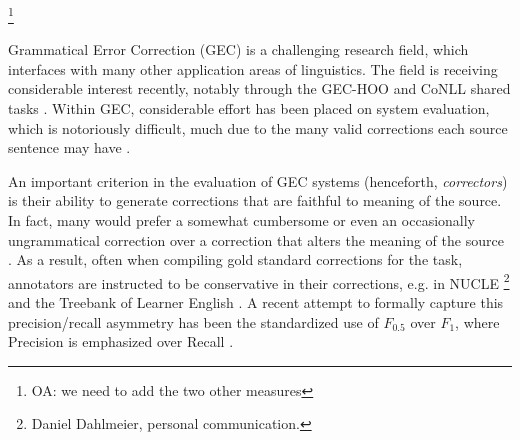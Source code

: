\documentclass[letter,11pt]{article}
\newcommand{\oa}[1]{\footnote{\color{red}OA: #1}}
\begin{document}



\oa{we need to add the two other measures}

Grammatical Error Correction (GEC) is a challenging research field, which interfaces with many
other application areas of linguistics. The field is receiving considerable
interest recently, notably through the GEC-HOO \cite{dale2011helping,dale2012hoo} and
CoNLL shared tasks \cite{kao2013conll,ng2014conll}.
Within GEC, considerable effort has been placed on system evaluation,
which is notoriously difficult,
much due to the many valid corrections each source sentence may have
\cite{tetreault2008native,madnani2011they,chodorow2012problems,dahlmeier2012better}.

An important criterion in the evaluation of GEC systems (henceforth, {\it correctors})
is their ability to generate corrections that are faithful to meaning of the source. In fact, many would prefer
a somewhat cumbersome or even an occasionally ungrammatical correction over a correction
that alters the meaning of the source \cite{brockett2006correcting}.
As a result, often when compiling gold standard corrections for the task,
annotators are instructed to be conservative in their corrections, e.g. in NUCLE \footnote{Daniel Dahlmeier, personal communication.} and the Treebank of Learner English \cite{nicholls2003cambridge}.
A recent attempt to formally capture this precision/recall asymmetry has
been the standardized use of $F_{0.5}$ over $F_{1}$, where Precision is
emphasized over Recall \cite{dahlmeier2012better}.
\end{document}
